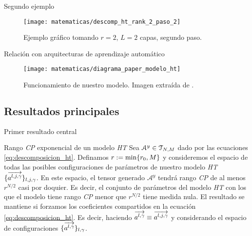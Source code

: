 \begin{frame}{Segundo ejemplo}

	\begin{figure}
		\texttt{[image: matematicas/descomp\_ht\_rank\_2\_paso\_2]}
		\caption{Ejemplo gráfico tomando $r = 2$, $L = 2$ capas, segundo paso.}
	\end{figure}

\end{frame}

\begin{frame}{Relación con arquitecturas de aprendizaje automático}

	\begin{figure}
		\centering
		\texttt{[image: matematicas/diagrama\_paper\_modelo\_ht]}
		\caption{Funcionamiento de nuestro modelo. Imagen extraída de \cite{matematicas:principal}.}
	\end{figure}


\end{frame}

\subsection{Resultados principales}

\begin{frame}{Primer resultado central}

	\begin{block}{Rango \textit{CP} exponencial de un modelo \textit{HT}}
		Sea $\mathcal{A}^y \in \mathcal{T}_{N, M}$ dado por las ecuaciones \eqref{eq:descomposicion_ht}. Definamos $r := \min \{ r_0, M \}$ y consideremos el espacio de todas las posibles configuraciones de parámetros de nuestro modelo \textit{HT} $\{  \overrightarrow{a^{l, j, \gamma}} \}_{l, j, \gamma}$. En este espacio, el tensor generado $\mathcal{A}^y$ tendrá rango \textit{CP} de al menos $r^{N/2}$ casi por doquier. Es decir, el conjunto de parámetros del modelo \textit{HT} con los que el modelo tiene rango \textit{CP} menor que $r^{N/2}$ tiene medida nula. El resultado se mantiene si forzamos los coeficientes compartidos en la ecuación \eqref{eq:descomposicion_ht}. Es decir, haciendo $\overrightarrow{a^{l, \gamma}} \equiv \overrightarrow{a^{l, j, \gamma}}$ y considerando el espacio de configuraciones $\{ \overrightarrow{a^{l, \gamma}}  \}_{l, \gamma}$.

	\end{block}


\end{frame}

